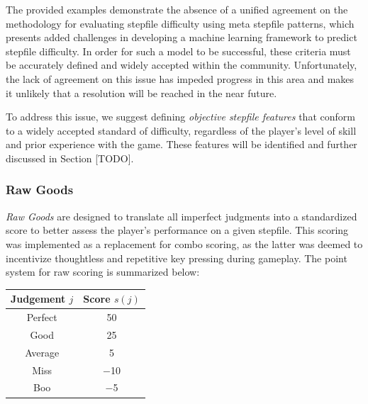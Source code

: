 \vspace{2mm}

The provided examples demonstrate the absence of a unified agreement on the methodology for evaluating stepfile difficulty using meta stepfile patterns, which presents added challenges in developing a machine learning framework to predict stepfile difficulty. In order for such a model to be successful, these criteria must be accurately defined and widely accepted within the community. Unfortunately, the lack of agreement on this issue has impeded progress in this area and makes it unlikely that a resolution will be reached in the near future.

\vspace{2mm}

To address this issue, we suggest defining \textit{objective stepfile features} that conform to a widely accepted standard of difficulty, regardless of the player's level of skill and prior experience with the game. These features will be identified and further discussed in Section [TODO].

\subsubsection{Raw Goods}

\textit{Raw Goods} are designed to translate all imperfect judgments into a standardized score to better assess the player's performance on a given stepfile. This scoring was implemented as a replacement for combo scoring, as the latter was deemed to incentivize thoughtless and repetitive key pressing during gameplay. The point system for raw scoring is summarized below:

\begin{center}
	\begin{tabular}{c@{\hskip 10mm}c}
		\hspace{5mm} \textbf{Judgement} $j$ \hspace{5mm} & \textbf{Score} $s(j)$ \\
		\hline
		
		Perfect                               & 50                    \\
		Good                                  & 25                    \\
		Average                               & 5                     \\
		Miss                                  & $-$10                 \\
		Boo                                   & $-$5                  \\
	\end{tabular}
\end{center}


